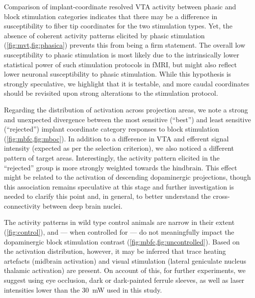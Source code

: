Comparison of implant-coordinate resolved VTA activity between phasic and block stimulation categories indicates that there may be a difference in susceptibility to fiber tip coordinates for the two stimulation types.
Yet, the absence of coherent activity patterns elicited by phasic stimulation (\cref{fig:mvt,fig:phasica}) prevents this from being a firm statement.
The overall low susceptibility to phasic stimulation is most likely due to the intrinsically lower statistical power of such stimulation protocols in fMRI, but might also reflect lower neuronal susceptibility to phasic stimulation.
While this hypothesis is strongly speculative, we highlight that it is testable, and more caudal coordinates should be revisited upon strong alterations to the stimulation protocol.

Regarding the distribution of activation across projection areas, we note a strong and unexpected divergence between the most sensitive (“best”) and least sensitive (“rejected”) implant coordinate category responses to block stimulation (\cref{fig:mbfc,fig:mboc}).
In addition to a difference in VTA and efferent signal intensity (expected as per the selection criterion), we also noticed a different pattern of target areas.
Interestingly, the activity pattern elicited in the “rejected” group is more strongly weighted towards the hindbrain.
This effect might be related to the activation of descending dopaminergic projections, though this association remains speculative at this stage and further investigation is needed to clarify this point and, in general, to better understand the cross-connectivity between deep brain nuclei.

The activity patterns in wild type control animals are narrow in their extent (\cref{fig:control}), and --- when controlled for --- do not meaningfully impact the dopaminergic block stimulation contrast (\cref{fig:mbfc,fig:uncontrolled}).
Based on the activation distribution, however, it may be inferred that trace heating artefacts (midbrain activation) and visual stimulation (lateral geniculate nucleus thalamic activation) are present.
On account of this, for further experiments, we suggest using eye occlusion, dark or dark-painted ferrule sleeves, as well as laser intensities lower than the \SI{30}{\milli\watt} used in this study.

